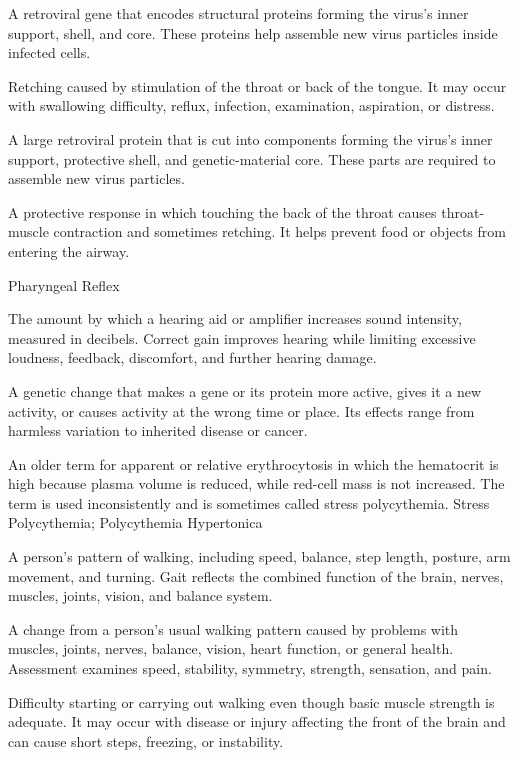  A retroviral gene that encodes structural proteins forming the virus’s inner support, shell, and core. These proteins help assemble new virus particles inside infected cells.

 Retching caused by stimulation of the throat or back of the tongue. It may occur with swallowing difficulty, reflux, infection, examination, aspiration, or distress.

 A large retroviral protein that is cut into components forming the virus’s inner support, protective shell, and genetic-material core. These parts are required to assemble new virus particles.

 A protective response in which touching the back of the throat causes throat-muscle contraction and sometimes retching. It helps prevent food or objects from entering the airway.

\synonyms
Pharyngeal Reflex

 The amount by which a hearing aid or amplifier increases sound intensity, measured in decibels. Correct gain improves hearing while limiting excessive loudness, feedback, discomfort, and further hearing damage.

 A genetic change that makes a gene or its protein more active, gives it a new activity, or causes activity at the wrong time or place. Its effects range from harmless variation to inherited disease or cancer.

 An older term for apparent or relative erythrocytosis in which the hematocrit is high because plasma volume is reduced, while red-cell mass is not increased. The term is used inconsistently and is sometimes called stress polycythemia.
\synonyms
Stress Polycythemia; Polycythemia Hypertonica

 A person’s pattern of walking, including speed, balance, step length, posture, arm movement, and turning. Gait reflects the combined function of the brain, nerves, muscles, joints, vision, and balance system.

 A change from a person’s usual walking pattern caused by problems with muscles, joints, nerves, balance, vision, heart function, or general health. Assessment examines speed, stability, symmetry, strength, sensation, and pain.

 Difficulty starting or carrying out walking even though basic muscle strength is adequate. It may occur with disease or injury affecting the front of the brain and can cause short steps, freezing, or instability.

